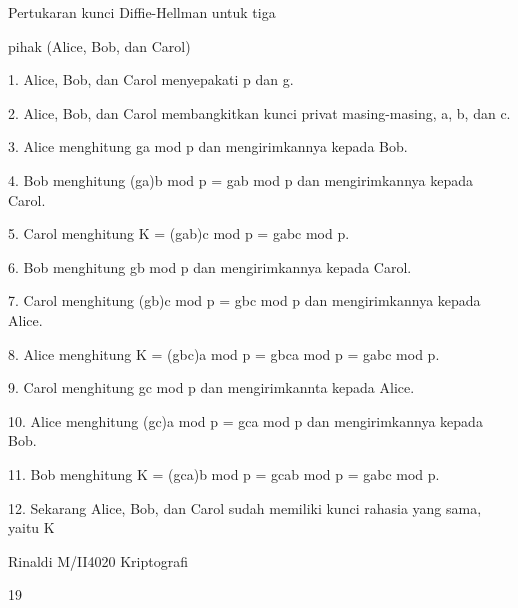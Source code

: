 \documentclass{article}
\begin{document}

Pertukaran kunci Diffie-Hellman untuk tiga 

pihak (Alice, Bob, dan Carol)

1. Alice, Bob, dan Carol menyepakati p dan g.

2. Alice, Bob, dan Carol membangkitkan kunci privat masing-masing, a, b, dan c.

3. Alice menghitung ga mod p dan mengirimkannya kepada Bob.

4. Bob menghitung (ga)b mod p = gab mod p dan mengirimkannya kepada Carol.

5. Carol menghitung  K = (gab)c mod p = gabc mod p.

6. Bob menghitung gb mod p dan mengirimkannya kepada Carol.

7. Carol menghitung (gb)c mod p = gbc mod p dan mengirimkannya kepada Alice.

8. Alice menghitung K = (gbc)a mod p = gbca mod p = gabc mod p.

9. Carol menghitung gc mod p dan mengirimkannta kepada Alice.

10. Alice menghitung  (gc)a mod p = gca mod p dan mengirimkannya kepada Bob.

11. Bob menghitung K = (gca)b mod p = gcab mod p = gabc mod p.

12. Sekarang Alice, Bob, dan Carol sudah memiliki kunci rahasia yang sama, yaitu K

Rinaldi M/II4020 Kriptografi

19
\end{document}
